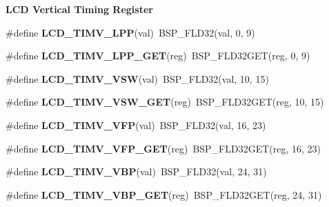 \begin{Indent}\textbf{ L\+CD Vertical Timing Register}\par
\begin{DoxyCompactItemize}
\item 
\#define {\bfseries L\+C\+D\+\_\+\+T\+I\+M\+V\+\_\+\+L\+PP}(val)~B\+S\+P\+\_\+\+F\+L\+D32(val, 0, 9)
\item 
\#define {\bfseries L\+C\+D\+\_\+\+T\+I\+M\+V\+\_\+\+L\+P\+P\+\_\+\+G\+ET}(reg)~B\+S\+P\+\_\+\+F\+L\+D32\+G\+ET(reg, 0, 9)
\item 
\#define {\bfseries L\+C\+D\+\_\+\+T\+I\+M\+V\+\_\+\+V\+SW}(val)~B\+S\+P\+\_\+\+F\+L\+D32(val, 10, 15)
\item 
\#define {\bfseries L\+C\+D\+\_\+\+T\+I\+M\+V\+\_\+\+V\+S\+W\+\_\+\+G\+ET}(reg)~B\+S\+P\+\_\+\+F\+L\+D32\+G\+ET(reg, 10, 15)
\item 
\#define {\bfseries L\+C\+D\+\_\+\+T\+I\+M\+V\+\_\+\+V\+FP}(val)~B\+S\+P\+\_\+\+F\+L\+D32(val, 16, 23)
\item 
\#define {\bfseries L\+C\+D\+\_\+\+T\+I\+M\+V\+\_\+\+V\+F\+P\+\_\+\+G\+ET}(reg)~B\+S\+P\+\_\+\+F\+L\+D32\+G\+ET(reg, 16, 23)
\item 
\#define {\bfseries L\+C\+D\+\_\+\+T\+I\+M\+V\+\_\+\+V\+BP}(val)~B\+S\+P\+\_\+\+F\+L\+D32(val, 24, 31)
\item 
\#define {\bfseries L\+C\+D\+\_\+\+T\+I\+M\+V\+\_\+\+V\+B\+P\+\_\+\+G\+ET}(reg)~B\+S\+P\+\_\+\+F\+L\+D32\+G\+ET(reg, 24, 31)
\end{DoxyCompactItemize}
\end{Indent}
